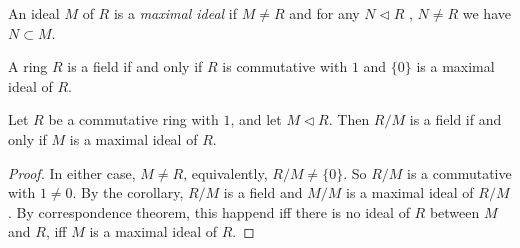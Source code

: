 \begin{definition}
	An ideal $M$ of $R$ is a \textit{maximal ideal} if $M \neq R$ and for any $N \triangleleft R$ , $N \neq R$ we have $N \subset M$.
\end{definition}
\begin{corollary}
	A ring $R$ is a field if and only if $R$ is commutative with $1$ and $\{0\} $ is a maximal ideal of $R$.
\end{corollary}

\begin{theorem}
	Let $R$ be a commutative ring with $1$, and let $M \triangleleft R$. Then $R / M$ is a field if and only if $M$ is a maximal ideal of $R$.
\end{theorem}
\begin{proof}
	In either case, $M \neq R$, equivalently, $R / M \neq  \{0\} $. So $R / M$ is a commutative with $1 \neq 0$. By the corollary, $R / M$ is a field and $M / M$ is a maximal ideal of $R / M$. By correspondence theorem, this happend iff there is no ideal of $R$ between $M$ and $R$, iff $M$ is a maximal ideal of $R$.
\end{proof}

